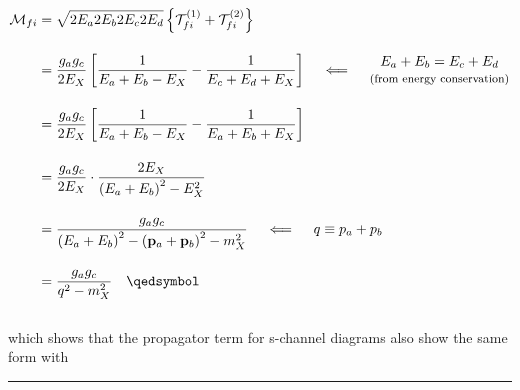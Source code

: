 \begin{solution}
\begin{align*}
    \mathcal{M}_{fi} &= \sqrt{2E_a2E_b2E_c2E_d} \left\{ \mathcal{T}_{fi}^{(1)}  + \mathcal{T}_{fi}^{(2)}  \right\} \\[0.15in]
                     &= \frac{g_a g_c}{2E_X}\left[\frac{1}{E_a + E_b - E_X }-\frac{1}{ E_c + E_d +E_X}  \right] \quad \impliedby  \quad
                     \begin{matrix}
                        E_a + E_b = E_c + E_d \\
                        \text{\footnotesize (from energy conservation)}
                     \end{matrix} \\[0.15in]
                     &= \frac{g_a g_c}{2E_X}\left[\frac{1}{E_a + E_b - E_X }-\frac{1}{ E_a + E_b +E_X}  \right] \\[0.15in]
                     &= \frac{g_a g_c}{2E_X} \cdot \frac{2E_X}{\left(E_a+E_b\right)^2 - E_X^2} \\[0.15in]
                     &= \frac{g_a g_c}{\left(E_a+E_b\right)^2 - \left(\boldp_a + \boldp_b \right)^2 - m_X^2} \quad \impliedby \quad q \equiv p_a + p_b \\[0.15in] 
                     &= \frac{g_a g_c}{q^2- m_X^2} \qed
\end{align*}\\
which shows that the propagator term for s-channel diagrams also show the same form with 
\end{solution}

\noindent\rule{7in}{1.5pt}


